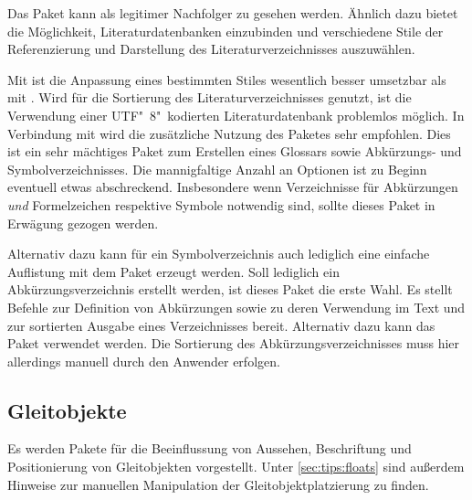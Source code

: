 \begin{DeclarePackages}
  Das Paket kann als legitimer Nachfolger zu  gesehen werden. 
  Ähnlich dazu bietet  die Möglichkeit, Literaturdatenbanken 
  einzubinden und verschiedene Stile der Referenzierung und Darstellung des 
  Literaturverzeichnisses auszuwählen. 
  
  Mit  ist die Anpassung eines bestimmten Stiles wesentlich 
  besser umsetzbar als mit . Wird  für die 
  Sortierung des Literaturverzeichnisses genutzt, ist die Verwendung einer 
  UTF"~8"~kodierten Literaturdatenbank problemlos möglich. In Verbindung mit 
   wird die zusätzliche Nutzung des Paketes 
   sehr empfohlen.
  Dies ist ein sehr mächtiges Paket zum Erstellen eines Glossars sowie 
  Abkürzungs- und Symbolverzeichnisses. Die mannigfaltige Anzahl an Optionen 
  ist zu Beginn eventuell etwas abschreckend. Insbesondere wenn Verzeichnisse 
  für Abkürzungen \emph{und} Formelzeichen respektive Symbole notwendig sind, 
  sollte dieses Paket in Erwägung gezogen werden.
  
  Alternativ dazu kann für ein Symbolverzeichnis auch lediglich eine einfache 
  Auflistung mit dem Paket  erzeugt werden.
  Soll lediglich ein Abkürzungsverzeichnis erstellt werden, ist dieses Paket 
  die erste Wahl. Es stellt Befehle zur Definition von Abkürzungen sowie zu 
  deren Verwendung im Text und zur sortierten Ausgabe eines Verzeichnisses 
  bereit. Alternativ dazu kann das Paket  verwendet werden. 
  Die Sortierung des Abkürzungsverzeichnisses muss hier allerdings manuell 
  durch den Anwender erfolgen.
\end{DeclarePackages}
%



\subsection{%
  Gleitobjekte%
}
%
Es werden Pakete für die Beeinflussung von Aussehen, Beschriftung und 
Positionierung von Gleitobjekten vorgestellt. Unter \autoref{sec:tips:floats} 
sind außerdem Hinweise zur manuellen Manipulation der Gleitobjektplatzierung zu 
finden.


